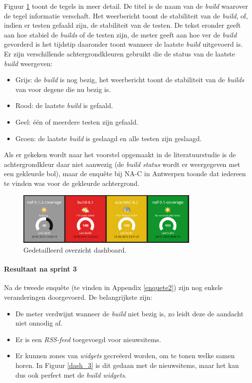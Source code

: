 \documentclass[10pt,a4paper]{article}
\begin{document}
Figuur \ref{dash_2} toont de tegels in meer detail. De titel is de naam van de \textit{build} waarover de tegel informatie verschaft. Het weerbericht toont de stabiliteit van de \textit{build}, of, indien er testen gefaald zijn, de stabiliteit van de testen. De tekst eronder geeft aan hoe stabiel de \textit{builds} of de testen zijn, de meter geeft aan hoe ver de \textit{build} gevorderd is het tijdstip daaronder toont wanneer de laatste \textit{build} uitgevoerd is.\\
Er zijn verschillende achtergrondkleuren gebruikt die de status van de laatste \textit{build} weergeven:
\begin{itemize}
\item Grijs: de \textit{build} is nog bezig, het weerbericht toont de stabiliteit van de \textit{builds} van voor degene die nu bezig is.
\item Rood: de laatste \textit{build} is gefaald.
\item Geel: \'e\'en of meerdere testen zijn gefaald.
\item Groen: de laatste \textit{build} is geslaagd en alle testen zijn geslaagd. 
\end{itemize}
Als er gekeken wordt naar het voorstel opgemaakt in de literatuurstudie is de achtergrondkleur daar niet aanwezig (de \textit{\textit{build} status} wordt er weergegeven met een gekleurde bol), maar de enqu\^ete bij NA-C in Antwerpen toonde dat iedereen te vinden was voor de gekleurde achtergrond.

\begin{figure}[ht!]
\centering
\includegraphics[width=90mm]{screenshot2.png}
\caption{Gedetailleerd overzicht dashboard.} 
\label{dash_2}
\end{figure}

\paragraph{Resultaat na sprint 3}
Na de tweede enqu\^ete (te vinden in Appendix \ref{enquete2}) zijn nog enkele veranderingen doorgevoerd. De belangrijkste zijn:
\begin{itemize}
\item De meter verdwijnt wanneer de \textit{build} niet bezig is, zo leidt deze de aandacht niet onnodig af.
\item Er is een \textit{RSS-feed} toegevoegd voor nieuwsitems.
\item Er kunnen zones van \textit{widgets} gecre\"eerd worden, om te tonen welke samen horen. In Figuur \ref{dash_3} is dit gedaan met de nieuwsitems, maar het kan dus ook perfect met de \textit{build widgets}.
\end{itemize}
\end{document}
